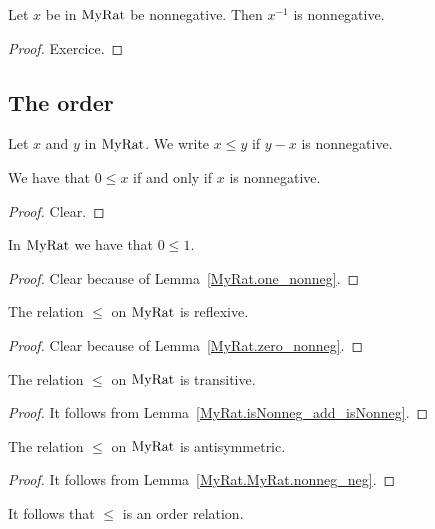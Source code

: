 \begin{lemma}
    \label{MyRat.nonneg_inv}
    \leanok
    Let $x$ be in $\mathrm{MyRat}$ be nonnegative. Then $x^{-1}$ is nonnegative.
\end{lemma}
\begin{proof}
    \leanok
    Exercice.
\end{proof}

\subsection{The order}

\begin{definition}
    \label{MyRat.le}
    \leanok
Let $x$ and $y$ in $\mathrm{MyRat}$. We write $x \leq y$ if $y - x$ is nonnegative.
\end{definition}

\begin{lemma}
    \label{MyRat.zero_le_iff_IsNonneg}
    \leanok
    We have that $0 \leq x$ if and only if $x$ is nonnegative.
\end{lemma}
\begin{proof}
    \leanok
    Clear.
\end{proof}

\begin{lemma}
    \label{MyRat.zero_le_one}
    \leanok
    In $\mathrm{MyRat}$ we have that $0 \leq 1$.
\end{lemma}
\begin{proof}
    \leanok
    Clear because of Lemma~\ref{MyRat.one_nonneg}.
\end{proof}

\begin{lemma}
    \label{MyRat.le_refl}
    \leanok
    The relation $\leq$ on $\mathrm{MyRat}$ is reflexive.
\end{lemma}
\begin{proof}
    \leanok
    Clear because of Lemma~\ref{MyRat.zero_nonneg}.
\end{proof}

\begin{lemma}
    \label{MyRat.le_trans}
    \leanok
    The relation $\leq$ on $\mathrm{MyRat}$ is transitive.
\end{lemma}
\begin{proof}
    \leanok
 It follows from Lemma~\ref{MyRat.isNonneg_add_isNonneg}.
\end{proof}

\begin{lemma}
    \label{MyRat.le_antisymm}
    \leanok
    The relation $\leq$ on $\mathrm{MyRat}$ is antisymmetric.
\end{lemma}
\begin{proof}
    \leanok
    It follows from Lemma~\ref{MyRat.MyRat.nonneg_neg}.
\end{proof}

It follows that $\leq$ is an order relation.